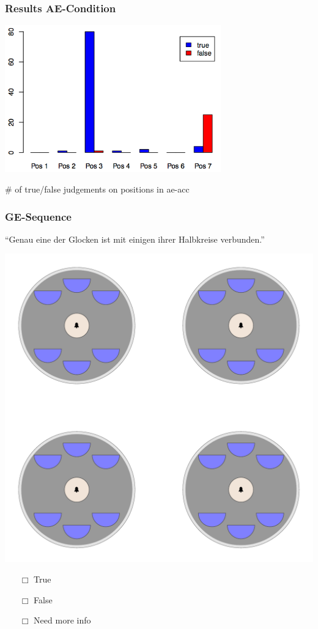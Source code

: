 \documentclass[fleqn,10pt,serif,xcolor=dvipsnames]{beamer}
\renewcommand{\AE}{AE}
\newcommand{\GE}{GE}
\newcommand{\mymark}[1]{{\color{blue}{#1}}}
\begin{document}
\begin{frame}
  \frametitle{Results \AE-Condition}
  \begin{center}
    \includegraphics[width=0.7\textwidth]{../../pictures/ae-acc.png}

    \vspace{0.2cm}
    \# of true/false judgements on positions in ae-acc
  \end{center}
\end{frame}

\begin{frame}
  \frametitle{\GE-Sequence}
  \begin{center}
    ``Genau eine der Glocken ist mit einigen ihrer Halbkreise verbunden.''

    \vspace{0.1cm}

    \includegraphics[width=0.5 \textwidth]{../../pictures/ge_01_1.pdf}

    \vspace{0.1cm}

    \begin{multicols}{3}
      \begin{itemize} 
      \item[$\Box$] True\\
        \onslide<2>{$\leadsto$  \mymark{false}}
      \item[$\Box$] False\\
        \onslide<2>{$\leadsto$ \mymark{false}}
      \item[$\Box$] Need more info 
      \end{itemize}
    \end{multicols}

  \end{center}
\end{frame}
\end{document}
